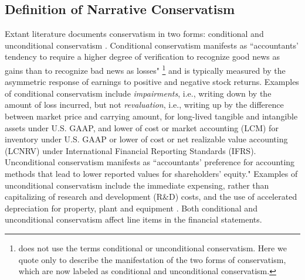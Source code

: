 \documentclass[letterpaper,11pt]{article}
\begin{document}
\begin{spacing}{1.5}
\subsection{Definition of Narrative Conservatism}\label{sec2.2}
\noindent Extant literature documents conservatism in two forms: conditional and unconditional conservatism \cite{beaverConditionalUnconditionalConservatism2005}. Conditional conservatism manifests as ``accountants' tendency to require a higher degree of verification to recognize good news as gains than to recognize bad news as losses" \cite[p. 7]{basuConservatismPrincipleAsymmetric1997}\footnote{ does not use the terms conditional or unconditional conservatism. Here we quote  only to describe the manifestation of the two forms of conservatism, which are now labeled as conditional and unconditional conservatism.} and is typically measured by the asymmetric response of earnings to positive and negative stock returns. Examples of conditional conservatism include \textit{impairments}, i.e., writing down by the amount of loss incurred, but not \textit{revaluation}, i.e., writing up by the difference between market price and carrying amount, for long-lived tangible and intangible assets under U.S. GAAP, and lower of cost or market accounting (LCM) for inventory under U.S. GAAP or lower of cost or net realizable value accounting (LCNRV) under International Financial Reporting Standards (IFRS). Unconditional conservatism manifests as ``accountants' preference for accounting methods that lead to lower reported values for shareholders' equity." \cite[p. 8]{basuConservatismPrincipleAsymmetric1997} Examples of unconditional conservatism include the immediate expensing, rather than capitalizing of research and development (R\&D) costs, and the use of accelerated depreciation for property, plant and equipment \cite{beaverConditionalUnconditionalConservatism2005}. Both conditional and unconditional conservatism affect line items in the financial statements. 


\end{spacing}
\end{document}
